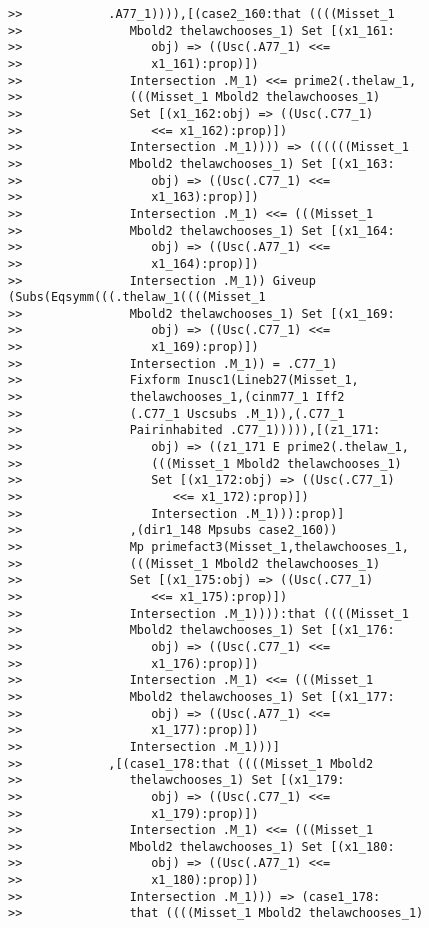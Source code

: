 \documentclass[12pt]{article}
\begin{document}
\begin{verbatim}
>>            .A77_1)))),[(case2_160:that ((((Misset_1
>>               Mbold2 thelawchooses_1) Set [(x1_161:
>>                  obj) => ((Usc(.A77_1) <<=
>>                  x1_161):prop)])
>>               Intersection .M_1) <<= prime2(.thelaw_1,
>>               (((Misset_1 Mbold2 thelawchooses_1)
>>               Set [(x1_162:obj) => ((Usc(.C77_1)
>>                  <<= x1_162):prop)])
>>               Intersection .M_1)))) => ((((((Misset_1
>>               Mbold2 thelawchooses_1) Set [(x1_163:
>>                  obj) => ((Usc(.C77_1) <<=
>>                  x1_163):prop)])
>>               Intersection .M_1) <<= (((Misset_1
>>               Mbold2 thelawchooses_1) Set [(x1_164:
>>                  obj) => ((Usc(.A77_1) <<=
>>                  x1_164):prop)])
>>               Intersection .M_1)) Giveup (Subs(Eqsymm(((.thelaw_1((((Misset_1
>>               Mbold2 thelawchooses_1) Set [(x1_169:
>>                  obj) => ((Usc(.C77_1) <<=
>>                  x1_169):prop)])
>>               Intersection .M_1)) = .C77_1)
>>               Fixform Inusc1(Lineb27(Misset_1,
>>               thelawchooses_1,(cinm77_1 Iff2
>>               (.C77_1 Uscsubs .M_1)),(.C77_1
>>               Pairinhabited .C77_1))))),[(z1_171:
>>                  obj) => ((z1_171 E prime2(.thelaw_1,
>>                  (((Misset_1 Mbold2 thelawchooses_1)
>>                  Set [(x1_172:obj) => ((Usc(.C77_1)
>>                     <<= x1_172):prop)])
>>                  Intersection .M_1))):prop)]
>>               ,(dir1_148 Mpsubs case2_160))
>>               Mp primefact3(Misset_1,thelawchooses_1,
>>               (((Misset_1 Mbold2 thelawchooses_1)
>>               Set [(x1_175:obj) => ((Usc(.C77_1)
>>                  <<= x1_175):prop)])
>>               Intersection .M_1)))):that ((((Misset_1
>>               Mbold2 thelawchooses_1) Set [(x1_176:
>>                  obj) => ((Usc(.C77_1) <<=
>>                  x1_176):prop)])
>>               Intersection .M_1) <<= (((Misset_1
>>               Mbold2 thelawchooses_1) Set [(x1_177:
>>                  obj) => ((Usc(.A77_1) <<=
>>                  x1_177):prop)])
>>               Intersection .M_1)))]
>>            ,[(case1_178:that ((((Misset_1 Mbold2
>>               thelawchooses_1) Set [(x1_179:
>>                  obj) => ((Usc(.C77_1) <<=
>>                  x1_179):prop)])
>>               Intersection .M_1) <<= (((Misset_1
>>               Mbold2 thelawchooses_1) Set [(x1_180:
>>                  obj) => ((Usc(.A77_1) <<=
>>                  x1_180):prop)])
>>               Intersection .M_1))) => (case1_178:
>>               that ((((Misset_1 Mbold2 thelawchooses_1)

\end{verbatim}
\end{document}
